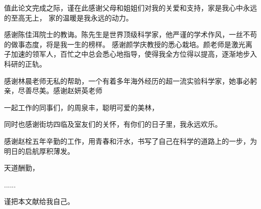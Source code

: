 
\begin{thanks}

值此论文完成之际，谨在此感谢父母和姐姐们对我的关爱和支持，家是我心中永远的至高无上， 家的温暖是我永远的动力。

感谢陈佳洱院士的教诲。陈先生是世界顶级科学家，他严谨的学术作风，一丝不苟的做事态度，将是我一生的榜样。
感谢颜学庆教授的悉心栽培。颜老师是激光离子加速的领军人，百忙之中总会悉心地指导，使得我全方位得以提高，逐渐地步入科研的正轨。

感谢林晨老师无私的帮助，一个有着多年海外经历的超一流实验科学家，她事必躬亲，尽善尽美。感谢赵妍英老师

一起工作的同事们，的周泉丰，聪明可爱的美林，

同时也感谢街坊四临及室友们的关怀，有你们的日子里，我永远欢乐。

感谢赵栓五年辛勤的工作，用青春和汗水，书写了自己在科学的道路上的一步，为明日的启航厚积薄发。

天道酬勤，


......

\vskip 18pt

谨把本文献给我自己。

\end{thanks}
